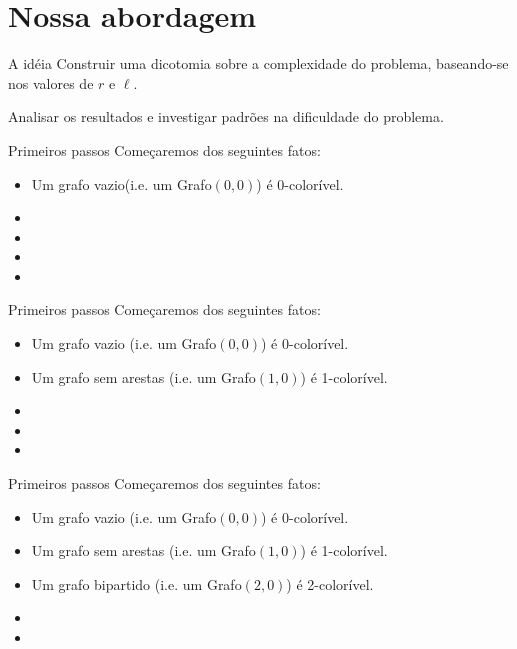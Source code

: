 \documentclass[9pt, compress]{beamer}
\begin{document}
    \section{Nossa abordagem}
    \begin{frame}{A idéia}
      Construir uma dicotomia sobre a complexidade do problema, baseando-se nos valores de $r$ e $\ell$.
      
      Analisar os resultados e investigar padrões na dificuldade do problema.
    \end{frame}
    \begin{frame}{Primeiros passos}
      Começaremos dos seguintes fatos:
      \begin{itemize}
        \item Um grafo vazio(i.e. um Grafo$(0,0)$) é 0-colorível.
        \item 
        \item 
        \item 
         \item                                                                                                                
      \end{itemize}
    \end{frame}
    \begin{frame}{Primeiros passos}
      Começaremos dos seguintes fatos:
      \begin{itemize}
        \item Um grafo vazio (i.e. um Grafo$(0,0)$) é 0-colorível.
        \item Um grafo sem arestas (i.e. um Grafo$(1,0)$) é 1-colorível.
        \item 
        \item 
         \item                                                                                                                
      \end{itemize}
    \end{frame}
    \begin{frame}{Primeiros passos}
      Começaremos dos seguintes fatos:
      \begin{itemize}
        \item Um grafo vazio (i.e. um Grafo$(0,0)$) é 0-colorível.
        \item Um grafo sem arestas (i.e. um Grafo$(1,0)$) é 1-colorível.
        \item Um grafo bipartido (i.e. um Grafo$(2,0)$) é 2-colorível.
        \item 
         \item                                                                                                                
      \end{itemize}
    \end{frame}
\end{document}
